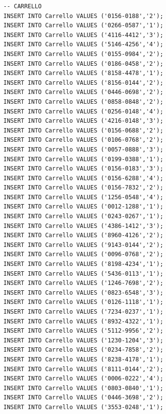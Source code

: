 \documentclass[12pt]{report}
\begin{document}
\begin{scriptsize}
\begin{verbatim}
-- CARRELLO
INSERT INTO Carrello VALUES ('0156-0188','2');
INSERT INTO Carrello VALUES ('0266-0587','1');
INSERT INTO Carrello VALUES ('4116-4412','3');
INSERT INTO Carrello VALUES ('5146-4256','4');
INSERT INTO Carrello VALUES ('0155-0984','2');
INSERT INTO Carrello VALUES ('0186-0458','2');
INSERT INTO Carrello VALUES ('8158-4478','1');
INSERT INTO Carrello VALUES ('8156-0144','2');
INSERT INTO Carrello VALUES ('0446-0698','2');
INSERT INTO Carrello VALUES ('0858-0848','2');
INSERT INTO Carrello VALUES ('0256-0148','4');
INSERT INTO Carrello VALUES ('4216-0148','3');
INSERT INTO Carrello VALUES ('0156-0688','2');
INSERT INTO Carrello VALUES ('0106-0768','2');
INSERT INTO Carrello VALUES ('0057-0888','3');
INSERT INTO Carrello VALUES ('0199-0388','1');
INSERT INTO Carrello VALUES ('0156-0183','3');
INSERT INTO Carrello VALUES ('0156-6288','4');
INSERT INTO Carrello VALUES ('0156-7832','2');
INSERT INTO Carrello VALUES ('1256-0548','4');
INSERT INTO Carrello VALUES ('0012-1288','1');
INSERT INTO Carrello VALUES ('0243-0267','1');
INSERT INTO Carrello VALUES ('4386-1412','3');
INSERT INTO Carrello VALUES ('8960-4126','2');
INSERT INTO Carrello VALUES ('9143-0144','2');
INSERT INTO Carrello VALUES ('0096-0768','2');
INSERT INTO Carrello VALUES ('8198-4234','1');
INSERT INTO Carrello VALUES ('5436-0113','1');
INSERT INTO Carrello VALUES ('1246-7698','2');
INSERT INTO Carrello VALUES ('0823-6548','3');
INSERT INTO Carrello VALUES ('0126-1118','1');
INSERT INTO Carrello VALUES ('7234-0237','1');
INSERT INTO Carrello VALUES ('8932-4322','1');
INSERT INTO Carrello VALUES ('5112-9956','2');
INSERT INTO Carrello VALUES ('1230-1204','3');
INSERT INTO Carrello VALUES ('0234-7858','2');
INSERT INTO Carrello VALUES ('8238-4178','1');
INSERT INTO Carrello VALUES ('8111-0144','2');
INSERT INTO Carrello VALUES ('0006-0222','4');
INSERT INTO Carrello VALUES ('0803-0840','1');
INSERT INTO Carrello VALUES ('0446-3698','2');
INSERT INTO Carrello VALUES ('3553-0248','1');


\end{verbatim}
\end{scriptsize}
\end{document}
